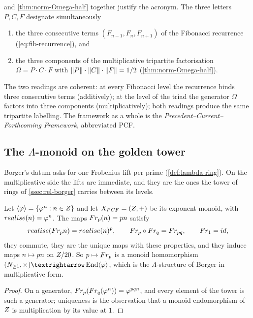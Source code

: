 \begin{remark}\label{rmk:PCF-acronym}
 and \cref{thm:norm-Omega-half}
together justify the acronym.  The three letters $P, C, F$
designate simultaneously
\begin{enumerate}[label=\textup{(\roman*)},nosep]
\item the three consecutive terms $(F_{n-1}, F_n, F_{n+1})$ of the
Fibonacci recurrence \textup{(\cref{eq:fib-recurrence})}, and
\item the three components of the multiplicative tripartite
factorisation $\Omega = P\cdot C\cdot F$ with
$\|P\|\cdot\|C\|\cdot\|F\| = 1/2$
\textup{(\cref{thm:norm-Omega-half})}.
\end{enumerate}
The two readings are coherent: at every Fibonacci level the
recurrence binds three consecutive terms (additively); at the
level of the triad the generator $\Omega$ factors into three
components (multiplicatively); both readings produce the same
tripartite labelling.  The framework as a whole is the
\emph{Precedent--Current--Forthcoming Framework}, abbreviated PCF.
\end{remark}

\subsection{The $\Lambda$-monoid on the golden tower}\label{sec:lambda-monoid}

Borger's datum asks for one Frobenius lift per prime
(\cref{def:lambda-ring}).  On the multiplicative side the lifts are immediate,
and they are the ones the tower of rings of \cref{ssec:rel-borger} carries between
its levels.

\begin{proposition}\label{thm:lambda-monoid}
Let $\langle\varphi\rangle=\{\varphi^n:n\in Z\}$ and let $X_{PCF}=(Z,+)$ be its
exponent monoid, with $realise(n)=\varphi^n$.  The maps
$Fr_p(n)=pn$ satisfy
\[
  realise(Fr_pn)=realise(n)^p,\qquad
  Fr_p\circ Fr_q=Fr_{pq},\qquad Fr_1=id,
\]
they commute, they are the unique maps with these properties, and they induce
maps $n\mapsto pn$ on $Z/20$.  So $p\mapsto Fr_p$ is a monoid homomorphism
$(\N_{\ge1},\times)\to\operatorname{End}\langle\golden\rangle$, which is the
$\Lambda$-structure of Borger in multiplicative form.
\end{proposition}
\begin{proof}
On a generator, $Fr_p(Fr_q(\varphi^n))=\varphi^{pqn}$, and every element of
the tower is such a generator; uniqueness is the observation that a monoid
endomorphism of $Z$ is multiplication by its value at $1$.
\end{proof}

